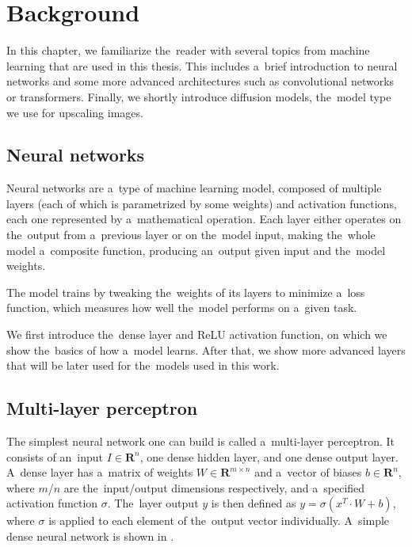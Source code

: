 \chapter{Background} \label{background}


In this chapter, we familiarize the~reader with several topics from machine learning that are used in this thesis. This includes a~brief introduction to neural networks and some more advanced architectures such as convolutional networks or transformers. Finally, we shortly introduce diffusion models, the~model type we use for upscaling images.

\section{Neural networks}

Neural networks are a~type of machine learning model, composed of multiple layers (each of which is parametrized by some weights) and activation functions, each one represented by a~mathematical operation. Each layer either operates on the~output from a~previous layer or on the~model input, making the~whole model a~composite function, producing an~output given input and the~model weights.

The model trains by tweaking the~weights of its layers to minimize a~loss function, which measures how well the~model performs on a~given task. 

We first introduce the~dense layer and ReLU activation function, on which we show the~basics of how a~model learns. After that, we show more advanced layers that will be later used for the~models used in this work. 

\section{Multi-layer perceptron}

The simplest neural network one can build is called a~multi-layer perceptron. It consists of an~input $I \in \mathbf{R}^{n}$, one dense hidden layer, and one dense output layer. A~dense layer has a~matrix of weights $W \in \mathbf{R}^{m \times n}$ and a~vector of biases $b \in \mathbf{R}^n$, where $m$/$n$ are the~input/output dimensions respectively, and a~specified activation function $\sigma$. The~layer output $y$ is then defined as $y = \sigma(x^T \cdot W + b)$, where $\sigma$ is applied to each element of the~output vector individually. A~simple dense neural network is shown in .

